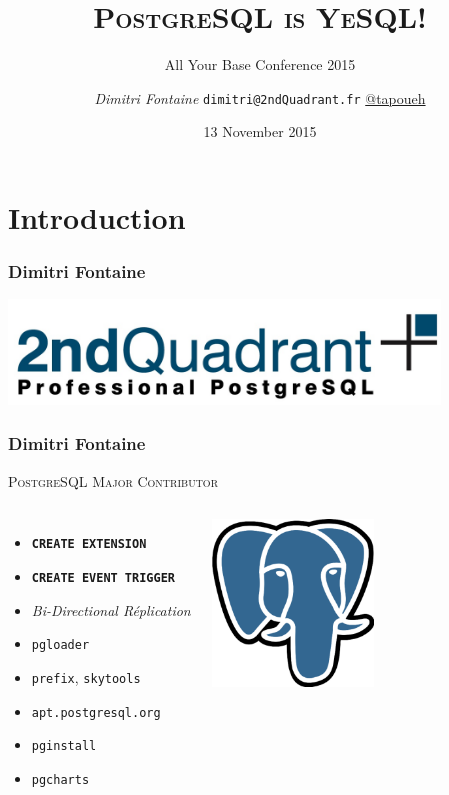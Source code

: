 \documentclass{beamer}
\title{\textsc{PostgreSQL is YeSQL!}}
\subtitle{All Your Base Conference 2015}
\author{\textit{Dimitri Fontaine} \texttt{dimitri@2ndQuadrant.fr}
  \linebreak
  \url{@tapoueh}}
\date{13 November 2015}
\begin{document}
\frame{\titlepage}

\section{Introduction}

\begin{frame}
  \frametitle{Dimitri Fontaine}

  \begin{center}
    \includegraphics[height=1.1in]{2ndquadrant_logo_full_color.jpg}
  \end{center}
\end{frame}

\begin{frame}[fragile]
  \frametitle{Dimitri Fontaine}

  \begin{center}
    {\Large \textsc{PostgreSQL Major Contributor}}
  \end{center}

  \begin{columns}[c]

    \begin{itemize}
    \item \texttt{\textbf{CREATE EXTENSION}}
    \item \texttt{\textbf{CREATE EVENT TRIGGER}}
    \item \textit{Bi-Directional Réplication}
    \item \texttt{pgloader}
    \item \texttt{prefix}, \texttt{skytools}
    \item \texttt{apt.postgresql.org}
    \item \texttt{pginstall}
    \item \texttt{pgcharts}
    \end{itemize}  

    \begin{center}
      \includegraphics[height=12em]{postgres-logo.eps}
    \end{center}
  \end{columns}
\end{frame}
\end{document}
